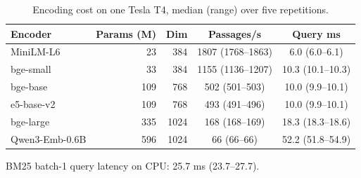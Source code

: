 \begin{table}[t]
\centering
\small
\caption{Encoding cost on one Tesla T4, median (range) over five repetitions.}
\label{tab:cost}
\begin{tabular}{lrrcc}
\toprule
Encoder & Params (M) & Dim & Passages/s & Query ms \\
\midrule
MiniLM-L6 & 23 & 384 & 1807 (1768--1863) & 6.0 (6.0--6.1) \\
bge-small & 33 & 384 & 1155 (1136--1207) & 10.3 (10.1--10.3) \\
bge-base & 109 & 768 & 502 (501--503) & 10.0 (9.9--10.1) \\
e5-base-v2 & 109 & 768 & 493 (491--496) & 10.0 (9.9--10.1) \\
bge-large & 335 & 1024 & 168 (168--169) & 18.3 (18.3--18.6) \\
Qwen3-Emb-0.6B & 596 & 1024 & 66 (66--66) & 52.2 (51.8--54.9) \\
\bottomrule
\end{tabular}
\par\smallskip\parbox{\linewidth}{\footnotesize BM25 batch-1 query latency on CPU: 25.7 ms (23.7--27.7).}
\end{table}
